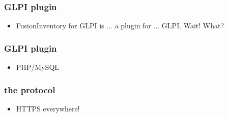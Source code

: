 %
%
\begin{frame}
    \frametitle{GLPI plugin}

    \begin{itemize}
        \item FusionInventory for GLPI is ... a plugin for ... GLPI. Wait! What? 
    \end{itemize}
\end{frame}

\begin{frame}
    \frametitle{GLPI plugin}

    \begin{itemize}
        \item PHP/MySQL
    \end{itemize}
\end{frame}

\begin{frame}
    \frametitle{the protocol}

    \begin{itemize}
        \item HTTPS everywhere! 
    \end{itemize}
\end{frame}



